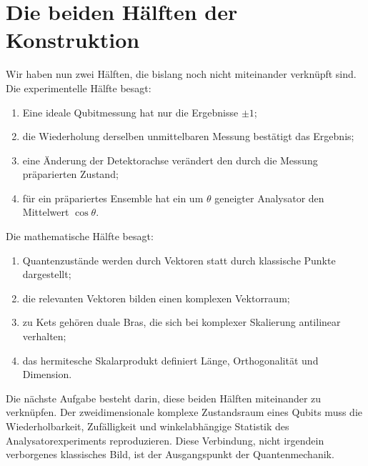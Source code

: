 \section{Die beiden Hälften der Konstruktion}

Wir haben nun zwei Hälften, die bislang noch nicht miteinander verknüpft sind. Die experimentelle Hälfte besagt:
\begin{enumerate}
  \item Eine ideale Qubitmessung hat nur die Ergebnisse \(\pm1\);
  \item die Wiederholung derselben unmittelbaren Messung bestätigt das Ergebnis;
  \item eine Änderung der Detektorachse verändert den durch die Messung präparierten Zustand;
  \item für ein präpariertes Ensemble hat ein um \(\theta\) geneigter Analysator den Mittelwert \(\cos\theta\).
\end{enumerate}
Die mathematische Hälfte besagt:
\begin{enumerate}
  \item Quantenzustände werden durch Vektoren statt durch klassische Punkte dargestellt;
  \item die relevanten Vektoren bilden einen komplexen Vektorraum;
  \item zu Kets gehören duale Bras, die sich bei komplexer Skalierung antilinear verhalten;
  \item das hermitesche Skalarprodukt definiert Länge, Orthogonalität und Dimension.
\end{enumerate}

Die nächste Aufgabe besteht darin, diese beiden Hälften miteinander zu verknüpfen. Der zweidimensionale komplexe Zustandsraum eines Qubits muss die Wiederholbarkeit, Zufälligkeit und winkelabhängige Statistik des Analysatorexperiments reproduzieren. Diese Verbindung, nicht irgendein verborgenes klassisches Bild, ist der Ausgangspunkt der Quantenmechanik.
